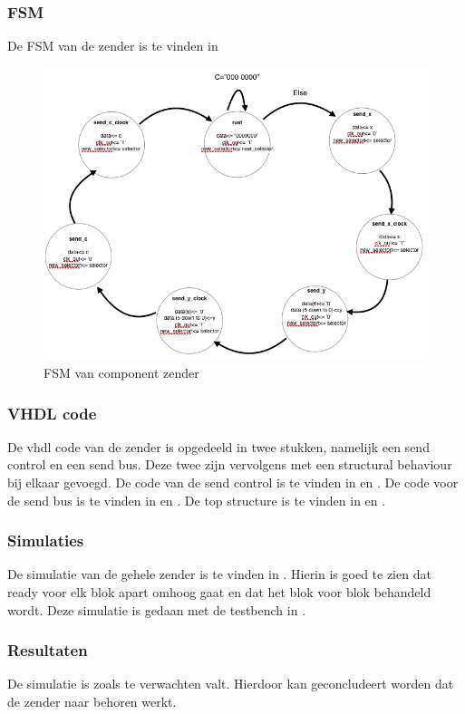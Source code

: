 \subsubsection{FSM}
De FSM van de zender is te vinden in \cite{fig:fsn_zender}
\begin{figure}[h!]
	\center
	\includegraphics[scale=1.9]{Figuren/LCD/fsm_sender.png}
	\caption{FSM van component zender}
	\label{fig:fsm_zender}
\end{figure}

\subsubsection{VHDL code}
De vhdl code van de zender is opgedeeld in twee stukken, namelijk een send control en een send bus. Deze twee zijn vervolgens met een structural behaviour bij elkaar gevoegd. De code van de send control is te vinden in \cite{code:ent_send_control} en \cite{code:beh_send_control}. De code voor de send bus is te vinden in \cite{code:ent_send_bus} en \cite{code:beh_send_bus}. De top structure is te vinden in \cite{code:ent_send_top} en \cite{code:struc_send_top}.

\subsubsection{Simulaties}
De simulatie van de gehele zender is te vinden in \cite{fig:sim_sender}. Hierin is goed te zien dat ready voor elk blok apart omhoog gaat en dat het blok voor blok behandeld wordt. Deze simulatie is gedaan met de testbench in \cite{code:tb_send_top}.

\subsubsection{Resultaten}
De simulatie is zoals te verwachten valt. Hierdoor kan geconcludeert worden dat de zender naar behoren werkt.